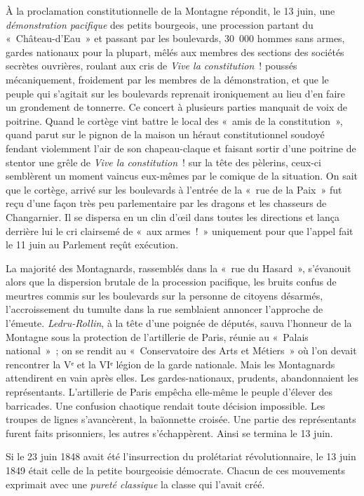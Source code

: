 \documentclass[french,twoside]{book} %
\begin{document}
À la proclamation constitutionnelle de la Montagne répondit, le 13 juin, une \emph{démonstration pacifique} des petits bourgeois, une procession partant du « Château-d’Eau » et passant par les boulevards, 30 000 hommes sans armes, gardes nationaux pour la plupart, mêlés aux membres des sections des sociétés secrètes ouvrières, roulant aux cris de \emph{Vive la constitution} ! poussés mécaniquement, froidement par les membres de la démonstration, et que le peuple qui s’agitait sur les boulevards reprenait ironiquement au lieu d’en faire un grondement de tonnerre. Ce concert à plusieurs parties manquait de voix de poitrine. Quand le cortège vint battre le local des « amis de la constitution », quand parut sur le pignon de la maison un héraut constitutionnel soudoyé fendant violemment l’air de son chapeau-claque et faisant sortir d’une poitrine de stentor une grêle de \emph{Vive la constitution} ! sur la tête des pèlerins, ceux-ci semblèrent un moment vaincus eux-mêmes par le comique de la situation. On sait que le cortège, arrivé sur les boulevards à l’entrée de la « rue de la Paix » fut reçu d’une façon très peu parlementaire par les dragons et les chasseurs de Changarnier. Il se dispersa en un clin d’œil dans toutes les directions et lança derrière lui le cri clairsemé de « aux armes ! » uniquement pour que l’appel fait le 11 juin au Parlement reçût exécution.\par
La majorité des Montagnards, rassemblés dans la « rue du Hasard », s’évanouit alors que la dispersion brutale de la procession pacifique, les bruits confus de meurtres commis sur les boulevards sur la personne de citoyens désarmés, l’accroissement du tumulte dans la rue semblaient annoncer l’approche de l’émeute. \emph{Ledru-Rollin}, à la tête d’une poignée de députés, sauva l’honneur de la Montagne sous la protection de l’artillerie de Paris, réunie au « Palais national » ; on se rendit au « Conservatoire des Arts et Métiers » où l’on devait rencontrer la Vᵉ et la VIᵉ légion de la garde nationale. Mais les Montagnards attendirent en vain après elles. Les gardes-nationaux, prudents, abandonnaient les représentants. L’artillerie de Paris empêcha elle-même le peuple d’élever des barricades. Une confusion chaotique rendait toute décision impossible. Les troupes de lignes s’avancèrent, la baïonnette croisée. Une partie des représentants furent faits prisonniers, les autres s’échappèrent. Ainsi se termina le 13 juin.\par
Si le 23 juin 1848 avait été l’insurrection du prolétariat révolutionnaire, le 13 juin 1849 était celle de la petite bourgeoisie démocrate. Chacun de ces mouvements exprimait avec une \emph{pureté classique} la classe qui l’avait créé.\par
\end{document}
